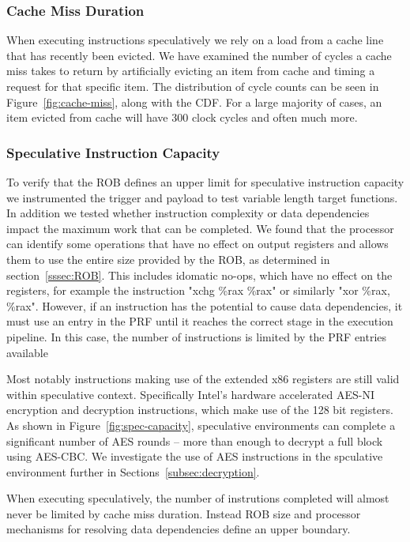 \subsubsection{Cache Miss Duration}
When executing instructions speculatively we rely on a load from a cache line that
has recently been evicted. We have examined the number of cycles a
cache miss takes to return by artificially evicting an item from cache and timing 
a request for that specific item. The distribution of cycle counts can be seen in
Figure~\ref{fig:cache-miss}, along with the CDF. For a large majority of cases, 
an item evicted from cache will have 300 clock cycles and often much more. 

\subsubsection{Speculative Instruction Capacity}
To verify that the ROB defines an upper limit for speculative instruction capacity
we instrumented the trigger and payload to test variable length target functions. 
In addition we tested whether instruction complexity or data dependencies impact
the maximum work that can be completed. We found that the processor can identify 
some operations that have no effect on output registers and allows them to use the 
entire size provided by the ROB, as determined in section~\ref{sssec:ROB}. This includes 
idomatic no-ops, which have no effect on the registers, for example the instruction 
"xchg \%rax \%rax" or similarly "xor \%rax, \%rax". However, if an instruction
has the potential to cause data dependencies, it must use an entry in the PRF
until it reaches the correct stage in the execution pipeline. In this case, the number 
of instructions is limited by the PRF entries available 

Most notably instructions making use of the extended x86 registers are still
valid within speculative context. Specifically Intel's hardware accelerated AES-NI
encryption and decryption instructions, which make use of the 128 bit registers.
As shown in Figure~\ref{fig:spec-capacity}, speculative environments can complete
a significant number of AES rounds -- more than enough to decrypt a full block 
using AES-CBC. We investigate the use of AES instructions in the spculative environment
further in Sections~\ref{subsec:decryption}.

\medskip

When executing speculatively, the number of instrutions completed 
will almost never be limited by cache miss duration. Instead
ROB size and processor mechanisms for resolving 
data dependencies define an upper boundary. 

